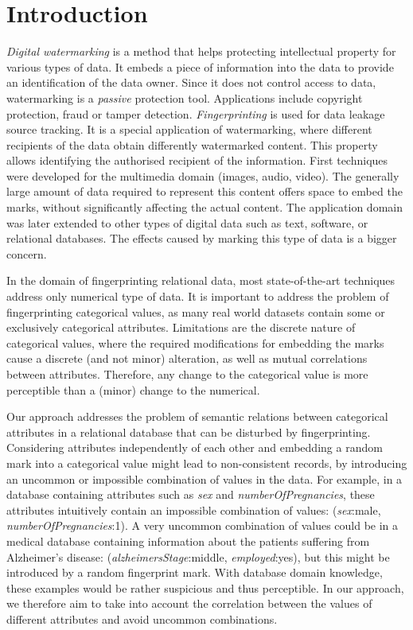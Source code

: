 \documentclass[runningheads]{llncs}
\begin{document}
\section{Introduction}\label{sec:intro}
\textit{Digital watermarking} is a method that helps protecting intellectual property for various types of  data. It embeds a piece of information into the data to provide an identification of the data owner.
Since it does not control access to data, watermarking is a \textit{passive} protection tool.
Applications include copyright protection, fraud or tamper detection.
\textit{Fingerprinting} is used for data leakage source tracking.
It is a special application of watermarking, where different recipients of the data obtain differently watermarked content.
This property allows identifying the authorised recipient of the information.
First techniques were developed for the multimedia domain (images, audio, video). 
The generally large amount of data required to represent this content offers space to embed the marks, without significantly affecting the actual content.
The application domain was later extended to other types of digital data such as text, software, or relational databases.
The effects caused by marking this type of data is a bigger concern. 

In the domain of fingerprinting relational data, most state-of-the-art techniques address only numerical type of data.
It is important to address the problem of fingerprinting categorical values, as  many real world datasets contain some or exclusively categorical attributes. 
Limitations are the discrete nature of categorical values, where the required modifications for embedding the marks cause a discrete (and not minor) alteration, as well as mutual correlations between attributes.
Therefore, any change to the categorical value is more perceptible than a (minor) change to the numerical.

Our approach addresses the problem of semantic relations between categorical attributes in a relational database that can be disturbed by fingerprinting. 
Considering attributes independently of each other and embedding a random mark into a categorical value might lead to non-consistent records, by introducing an uncommon or impossible combination of values in the data. 
For example, in a database containing attributes such as \textit{sex} and \textit{numberOfPregnancies}, these attributes intuitively contain an impossible combination of values: (\textit{sex}:male, \textit{numberOfPregnancies}:1).
A very uncommon combination of values could be in a medical database containing information about the patients suffering from Alzheimer's disease: 
(\textit{alzheimersStage}:middle, \textit{employed}:yes), but this might be introduced by a random fingerprint mark.
With database domain knowledge, these examples would be rather suspicious and thus perceptible. 
In our approach, we therefore aim to take into account the correlation between the values of different attributes and avoid uncommon combinations. 
\end{document}
